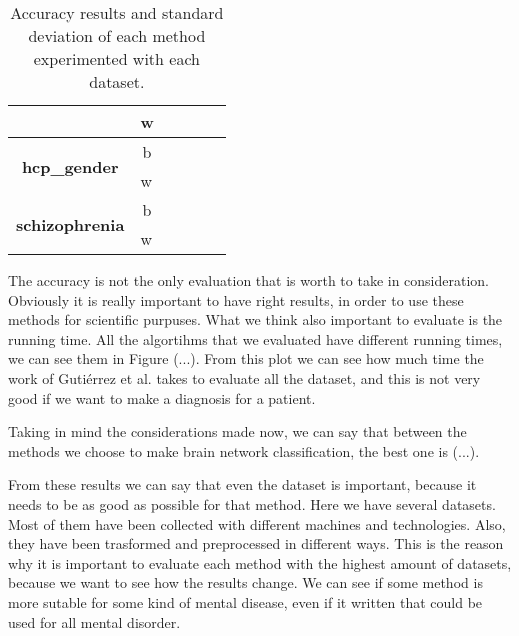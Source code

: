 \begin{table}
{\begin{tabular}{c|c|c|c|c|c}
	\cline{2-6}
	& \multicolumn{1}{l|}{w} & \multicolumn{1}{l|}{}        & \multicolumn{1}{l|}{} & \multicolumn{1}{l|}{} & \multicolumn{1}{l}{}  \\ 
	\midrule
	\multirow{2}{*}{\textbf{hcp\_gender}}   & b                      &                              &                       &                       &                       \\ 
	\cline{2-6}
	& \multicolumn{1}{l|}{w} & \multicolumn{1}{l|}{}        & \multicolumn{1}{l|}{} & \multicolumn{1}{l|}{} & \multicolumn{1}{l}{}  \\ 
	\midrule
	\multirow{2}{*}{\textbf{schizophrenia}} & b                      &                              &                       &                       &                       \\ 
	\cline{2-6}
	& \multicolumn{1}{l|}{w} & \multicolumn{1}{l|}{}        & \multicolumn{1}{l|}{} & \multicolumn{1}{l|}{} & \multicolumn{1}{l}{}  \\
	\bottomrule
\end{tabular}
}
\caption{Accuracy results and standard deviation of each method experimented with each dataset.}
\label{tab:all_results}
\end{table}

The accuracy is not the only evaluation that is worth to take in consideration. Obviously it is really important to have right results, in order to use these methods for scientific purpuses. What we think also important to evaluate is the running time. All the algortihms that we evaluated have different running times, we can see them in Figure (...). From this plot we can see how much time the work of Guti\'{e}rrez et al. \cite{GutierrezBio} takes to evaluate all the dataset, and this is not very good if we want to make a diagnosis for a patient. 
\vspace{0.5cm}

Taking in mind the considerations made now, we can say that between the methods we choose to make brain network classification, the best one is (...).

From these results we can say that even the dataset is important, because it needs to be as good as possible for that method. Here we have several datasets. Most of them have been collected with different machines and technologies. Also, they have been trasformed and preprocessed in different ways. This is the reason why it is important to evaluate each method with the highest amount of datasets, because we want to see how the results change. We can see if some method is more sutable for some kind of mental disease, even if it written that could be used for all mental disorder. 